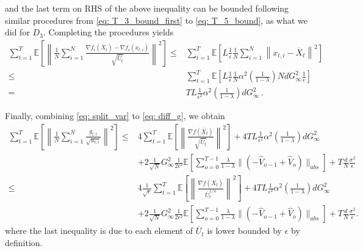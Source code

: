 \documentclass[11pt]{article}
\begin{document}
and the last term on RHS of the above inequality can be bounded following similar procedures from \eqref{eq: T_3_bound_first} to \eqref{eq: T_5_bound}, as what we did for $D_3$. Completing the procedures yields
\begin{align}\label{eq: diff_g}
\sum_{t=1}^T \mathbb E \left[  \left\|\frac{1}{N} \sum_{i=1}^N \frac{\nabla f_i(\overline X_t) - \nabla f_i(x_{t,i})}{\sqrt{\overline U_t}  } \right\|^2 \right] \leq & \sum_{t=1}^T \mathbb E \left [ L \frac{1}{\epsilon} \frac{1}{N} \sum_{i=1}^N \left\|x_{t,i} - \overline X_t \right\|^2 \right] \nonumber  \\
\leq & \sum_{t=1}^T \mathbb E \left [ L \frac{1}{\epsilon} \frac{1}{N} \alpha^2 \left( \frac{1}{1-\lambda}\right)Nd G_{\infty}^2 \frac{1}{\epsilon} \right] \nonumber \\
= & T L \frac{1}{\epsilon^2}  \alpha^2 \left( \frac{1}{1-\lambda}\right)d G_{\infty}^2 \, .
\end{align}

Finally, combining \eqref{eq: split_var} to \eqref{eq: diff_g}, we obtain
\begin{align}
 \sum_{t=1}^T \mathbb E\left[ \left\| \frac{1}{N} \sum_{i=1}^N \frac{g_{t,i}}{\sqrt{u_{t,i}}} \right\|^2 \right] 
\leq &  4 \sum_{t=1}^T \mathbb E \left[  \left\| \frac{\nabla f(\overline X_{t})}{\sqrt{\overline U_t}  } \right\|^2 \right] + 4 T L \frac{1}{\epsilon^2}  \alpha^2 \left( \frac{1}{1-\lambda}\right)d G_{\infty}^2  \nonumber \\
& +  2\frac{1}{\sqrt{N}}  G_{\infty}^2 \frac{1}{2\epsilon^2}   \mathbb E \left[   \sum_{o=0}^{T-1} \frac{\lambda}{1-\lambda}     \|    (- \hat V_{o-1} + \hat V_{o} ) \|_{abs}    \right]  + T \frac{d}{N}
\frac{ \sigma^2 }{\epsilon} \nonumber  \\
\leq &  4 \frac{1}{\sqrt{\epsilon}} \sum_{t=1}^T \mathbb E \left[  \left\| \frac{\nabla f(\overline X_{t})}{\overline U_t^{1/4}  } \right\|^2 \right] + 4 T L \frac{1}{\epsilon^2}  \alpha^2 \left( \frac{1}{1-\lambda}\right)d G_{\infty}^2 \nonumber   \\
& +  2\frac{1}{\sqrt{N}}  G_{\infty}^2 \frac{1}{2\epsilon^2}   \mathbb E \left[   \sum_{o=0}^{T-1} \frac{\lambda}{1-\lambda}     \|    (- \hat V_{o-1} + \hat V_{o} ) \|_{abs}    \right]  + T \frac{d}{N}
\frac{ \sigma^2 }{\epsilon}. \nonumber 
\end{align}
where the last inequality is due to each element of $\overline U_t$ is lower bounded by $\epsilon$ by definition.
\end{document}
